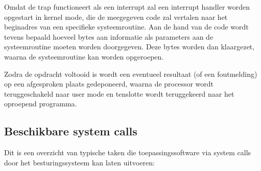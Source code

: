Omdat de trap functioneert als een interrupt zal een interrupt
handler worden opgestart in kernel mode, die de meegegeven code zal
vertalen naar het beginadres van een specifieke systeemroutine. Aan de
hand van de code wordt tevens bepaald hoeveel bytes aan informatie als
parameters aan de systeemroutine moeten worden doorgegeven. Deze bytes
worden dan klaargezet, waarna de systeemroutine kan worden
opgeroepen.

Zodra de opdracht voltooid is wordt een eventueel resultaat (of
een foutmelding) op een afgesproken plaats gedeponeerd, waarna de
processor wordt teruggeschakeld naar user mode en tenslotte wordt
teruggekeerd naar het oproepend programma.

\subsection{Beschikbare system calls}

Dit is een overzicht van typische taken die toepassingssoftware
via system calls door het besturingssysteem kan laten
uitvoeren:

